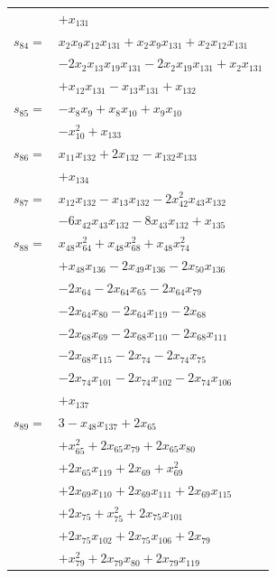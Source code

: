 \begin{longtable}{@{}r@{\;}l@{}}
 & \(\displaystyle +x_{131}\) \\[3pt]
\(s_{84}=\) & \(\displaystyle x_{2}x_{9}x_{12}x_{131} +x_{2}x_{9}x_{131} +x_{2}x_{12}x_{131}\) \\
 & \(\displaystyle -2x_{2}x_{13}x_{19}x_{131} -2x_{2}x_{19}x_{131} +x_{2}x_{131}\) \\
 & \(\displaystyle +x_{12}x_{131} -x_{13}x_{131} +x_{132}\) \\[3pt]
\(s_{85}=\) & \(\displaystyle -x_{8}x_{9} +x_{8}x_{10} +x_{9}x_{10}\) \\
 & \(\displaystyle -x_{10}^{2} +x_{133}\) \\[3pt]
\(s_{86}=\) & \(\displaystyle x_{11}x_{132} +2x_{132} -x_{132}x_{133}\) \\
 & \(\displaystyle +x_{134}\) \\[3pt]
\(s_{87}=\) & \(\displaystyle x_{12}x_{132} -x_{13}x_{132} -2x_{42}^{2}x_{43}x_{132}\) \\
 & \(\displaystyle -6x_{42}x_{43}x_{132} -8x_{43}x_{132} +x_{135}\) \\[3pt]
\(s_{88}=\) & \(\displaystyle x_{48}x_{64}^{2} +x_{48}x_{68}^{2} +x_{48}x_{74}^{2}\) \\
 & \(\displaystyle +x_{48}x_{136} -2x_{49}x_{136} -2x_{50}x_{136}\) \\
 & \(\displaystyle -2x_{64} -2x_{64}x_{65} -2x_{64}x_{79}\) \\
 & \(\displaystyle -2x_{64}x_{80} -2x_{64}x_{119} -2x_{68}\) \\
 & \(\displaystyle -2x_{68}x_{69} -2x_{68}x_{110} -2x_{68}x_{111}\) \\
 & \(\displaystyle -2x_{68}x_{115} -2x_{74} -2x_{74}x_{75}\) \\
 & \(\displaystyle -2x_{74}x_{101} -2x_{74}x_{102} -2x_{74}x_{106}\) \\
 & \(\displaystyle +x_{137}\) \\[3pt]
\(s_{89}=\) & \(\displaystyle 3 -x_{48}x_{137} +2x_{65}\) \\
 & \(\displaystyle +x_{65}^{2} +2x_{65}x_{79} +2x_{65}x_{80}\) \\
 & \(\displaystyle +2x_{65}x_{119} +2x_{69} +x_{69}^{2}\) \\
 & \(\displaystyle +2x_{69}x_{110} +2x_{69}x_{111} +2x_{69}x_{115}\) \\
 & \(\displaystyle +2x_{75} +x_{75}^{2} +2x_{75}x_{101}\) \\
 & \(\displaystyle +2x_{75}x_{102} +2x_{75}x_{106} +2x_{79}\) \\
 & \(\displaystyle +x_{79}^{2} +2x_{79}x_{80} +2x_{79}x_{119}\) \\

\end{longtable}
